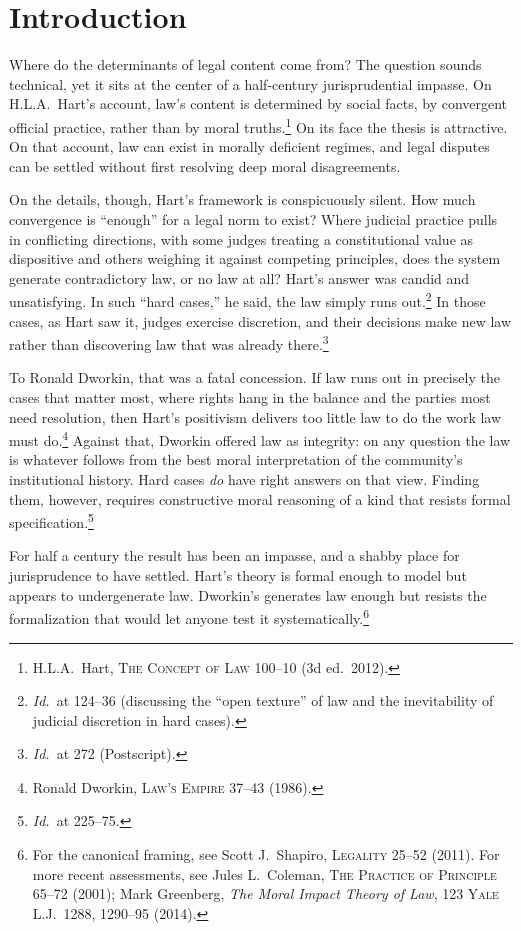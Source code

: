 \section{Introduction}

Where do the determinants of legal content come from? The question sounds
technical, yet it sits at the center of a half-century jurisprudential
impasse.
On H.L.A.\ Hart's account, law's content is determined by social facts, by
convergent official practice, rather than by moral
truths.\footnote{H.L.A.\ Hart, \textsc{The Concept of Law} 100--10 (3d
ed.\ 2012).} On its face the thesis is attractive. On that account, law can exist in
morally deficient regimes, and legal disputes can be settled without first
resolving deep moral disagreements.

On the details, though, Hart's framework is conspicuously silent. How much
convergence is ``enough'' for a legal norm to exist? Where judicial practice
pulls in conflicting directions, with some judges treating a constitutional
value as dispositive and others weighing it against competing principles,
does the system generate contradictory law, or no law at all? Hart's answer
was candid and unsatisfying. In such ``hard cases,'' he said, the law simply
runs out.\footnote{\textit{Id.}\ at 124--36 (discussing the ``open texture''
of law and the inevitability of judicial discretion in hard cases).} In those cases, as Hart saw it, judges exercise discretion, and their
decisions make new law rather than discovering law that was already there.\footnote{\textit{Id.}\ at 272
(Postscript).}

To Ronald Dworkin, that was a fatal concession. If law runs out in precisely
the cases that matter most, where rights hang in the balance and the parties
most need resolution, then Hart's positivism delivers too little law to do
the work law must do.\footnote{Ronald Dworkin, \textsc{Law's Empire} 37--43
(1986).} Against that, Dworkin offered law as integrity: on any question the law is
whatever follows from the best moral interpretation of the community's
institutional history. Hard cases \textit{do} have right answers on that
view. Finding them, however, requires constructive moral reasoning of a kind
that resists formal specification.\footnote{\textit{Id.}\ at
225--75.}

For half a century the result has been an impasse, and a shabby place for
jurisprudence to have settled. Hart's theory is formal enough to model but appears to undergenerate law.
Dworkin's generates law enough but resists the formalization that would let
anyone test it systematically.\footnote{For the canonical framing, see Scott J.\ Shapiro,
\textsc{Legality} 25--52 (2011). For more recent assessments, see Jules L.\
Coleman, \textsc{The Practice of Principle} 65--72 (2001); Mark Greenberg,
\textit{The Moral Impact Theory of Law}, 123 \textsc{Yale L.J.}\ 1288,
1290--95 (2014).}

